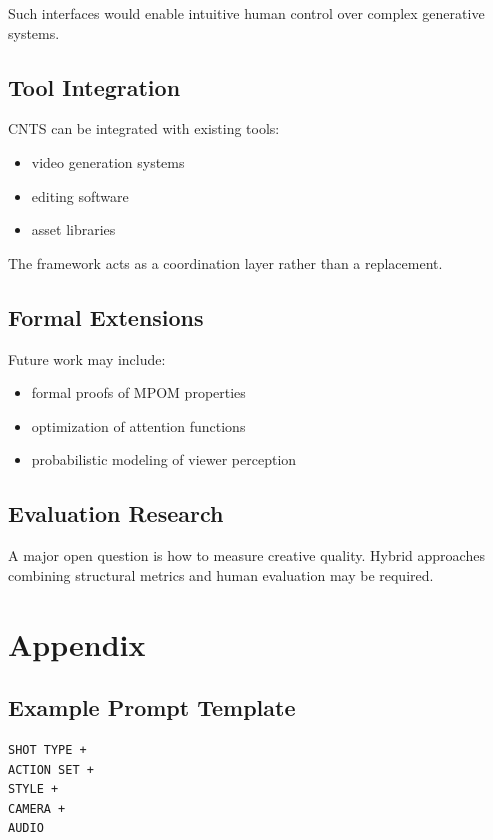 \documentclass[preprints,article,submit,pdftex,moreauthors,accept]{Definitions/mdpi}
\begin{document}
Such interfaces would enable intuitive human control over complex generative systems.

\subsection{Tool Integration}

CNTS can be integrated with existing tools:

\begin{itemize}
\item video generation systems
\item editing software
\item asset libraries
\end{itemize}

The framework acts as a coordination layer rather than a replacement.

\subsection{Formal Extensions}

Future work may include:

\begin{itemize}
\item formal proofs of MPOM properties
\item optimization of attention functions
\item probabilistic modeling of viewer perception
\end{itemize}

\subsection{Evaluation Research}

A major open question is how to measure creative quality. Hybrid approaches combining structural metrics and human evaluation may be required.

\section{Appendix}

\subsection{Example Prompt Template}

\begin{verbatim}
SHOT TYPE +
ACTION SET +
STYLE +
CAMERA +
AUDIO
\end{verbatim}
\end{document}
